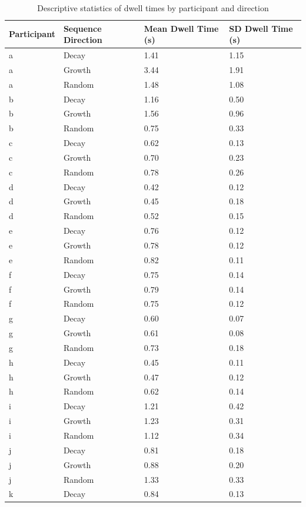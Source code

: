 \documentclass[english,jou]{apa6}
\begin{document}
\begin{table}[htbp]

\begin{center}
\begin{threeparttable}

\caption{\label{tab:tbyp}Descriptive statistics of dwell times by participant and direction}

\begin{tabular}{llll}
\toprule
Participant & Sequence Direction & Mean Dwell Time (s) & SD Dwell Time (s)\\
\midrule
a & Decay & 1.41 & 1.15\\
a & Growth & 3.44 & 1.91\\
a & Random & 1.48 & 1.08\\
b & Decay & 1.16 & 0.50\\
b & Growth & 1.56 & 0.96\\
b & Random & 0.75 & 0.33\\
c & Decay & 0.62 & 0.13\\
c & Growth & 0.70 & 0.23\\
c & Random & 0.78 & 0.26\\
d & Decay & 0.42 & 0.12\\
d & Growth & 0.45 & 0.18\\
d & Random & 0.52 & 0.15\\
e & Decay & 0.76 & 0.12\\
e & Growth & 0.78 & 0.12\\
e & Random & 0.82 & 0.11\\
f & Decay & 0.75 & 0.14\\
f & Growth & 0.79 & 0.14\\
f & Random & 0.75 & 0.12\\
g & Decay & 0.60 & 0.07\\
g & Growth & 0.61 & 0.08\\
g & Random & 0.73 & 0.18\\
h & Decay & 0.45 & 0.11\\
h & Growth & 0.47 & 0.12\\
h & Random & 0.62 & 0.14\\
i & Decay & 1.21 & 0.42\\
i & Growth & 1.23 & 0.31\\
i & Random & 1.12 & 0.34\\
j & Decay & 0.81 & 0.18\\
j & Growth & 0.88 & 0.20\\
j & Random & 1.33 & 0.33\\
k & Decay & 0.84 & 0.13\\

\end{tabular}
\end{threeparttable}
\end{center}
\end{table}
\end{document}
